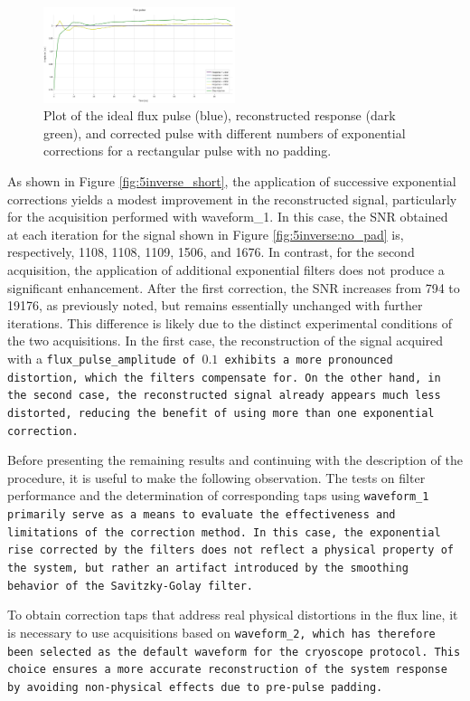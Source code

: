 \begin{figure}[h!]
    \centering
    \includegraphics[width=0.5\textwidth]{figures/png/Cryoscope/filters_long/5_inverse.png}
    \caption{Plot of the ideal flux pulse (blue), reconstructed response (dark green), and corrected pulse with different numbers of exponential corrections for a rectangular pulse with no padding.}
    \label{fig:5inverse:long}
\end{figure} 

As shown in Figure \ref{fig:5inverse_short}, the application of successive exponential corrections yields a modest improvement in the reconstructed signal, particularly for the acquisition performed with waveform\_1.
In this case, the SNR obtained at each iteration for the signal shown in Figure \ref{fig:5inverse:no_pad} is, respectively, 1108, 1108, 1109, 1506, and 1676.
In contrast, for the second acquisition, the application of additional exponential filters does not produce a significant enhancement.
After the first correction, the SNR increases from 794 to 19176, as previously noted, but remains essentially unchanged with further iterations.
This difference is likely due to the distinct experimental conditions of the two acquisitions. 
In the first case, the reconstruction of the signal acquired with a \tt{flux\_pulse\_amplitude} of $0.1$ exhibits a more pronounced distortion, which the filters compensate for. 
On the other hand, in the second case, the reconstructed signal already appears much less distorted, reducing the benefit of using more than one exponential correction.

Before presenting the remaining results and continuing with the description of the procedure, it is useful to make the following observation.
The tests on filter performance and the determination of corresponding taps using \tt{waveform\_1} primarily serve as a means to evaluate the effectiveness and limitations of the correction method. 
In this case, the exponential rise corrected by the filters does not reflect a physical property of the system, but rather an artifact introduced by the smoothing behavior of the Savitzky-Golay filter.

To obtain correction taps that address real physical distortions in the flux line, it is necessary to use acquisitions based on \tt{waveform\_2}, which has therefore been selected as the default waveform for the cryoscope protocol. 
This choice ensures a more accurate reconstruction of the system response by avoiding non-physical effects due to pre-pulse padding.


